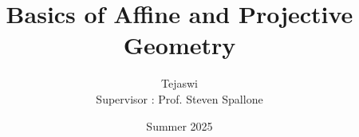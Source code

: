\documentclass[a4paper,12pt]{report}
\title{\Huge\textbf{Basics of Affine and Projective Geometry}}
\author{Tejaswi\\ Supervisor : Prof. Steven Spallone}
\date{Summer 2025}
\theoremstyle{definition}
\theoremstyle{remark}
\begin{document}
  \maketitle


  \tableofcontents
  \newpage


  
  
  

  \nocite{beg, audin, shirali}
  
  
\end{document}
